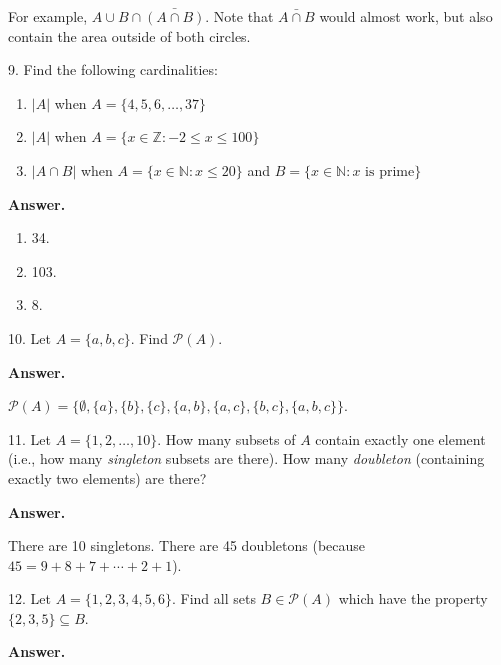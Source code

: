 \documentclass[10pt,]{book}
\theoremstyle{plain}
\theoremstyle{definition}
\theoremstyle{definition}
\theoremstyle{definition}
\def\N{\mathbb N}
\def\Z{\mathbb Z}
\def\pow{\mathcal P}
\def\st{:}
\begin{document}
\begin{exerciselist}
            For example, \(A \cup B \cap \bar{(A \cap B)}\). Note that \(\bar{A \cap B}\) would almost work, but also contain the area outside of both circles.
\item[9.]\hypertarget{exercise-9}{}
            Find the following cardinalities:
\leavevmode%
\begin{enumerate}[label=(\alph*)]
\item\hypertarget{li-108}{}\(|A|\) when \(A = \{4,5,6,\ldots,37\}\)\item\hypertarget{li-109}{}\(|A|\) when \(A = \{x \in \Z \st -2 \le x \le 100\}\)\item\hypertarget{li-110}{}\(|A \cap B|\) when \(A = \{x \in \N \st x \le 20\}\) and \(B = \{x \in \N \st x \mbox{ is prime} \}\)\end{enumerate}
\par\smallskip
\par\smallskip
\noindent\textbf{Answer.}\hypertarget{answer-9}{}\quad
\leavevmode%
\begin{enumerate}[label=(\alph*)]
\item\hypertarget{li-111}{}
                34.
\item\hypertarget{li-112}{}
                103.
\item\hypertarget{li-113}{}
                8.
\end{enumerate}
\item[10.]\hypertarget{exercise-10}{}
            Let \(A = \{a, b, c\}\). Find \(\pow(A)\).
\par\smallskip
\par\smallskip
\noindent\textbf{Answer.}\hypertarget{answer-10}{}\quad

            \(\pow(A) = \{\emptyset, \{a\}, \{b\}, \{c\}, \{a,b\}, \{a,c\}, \{b,c\}, \{a,b,c\}\}\).
\item[11.]\hypertarget{exercise-11}{}
            Let \(A = \{1,2,\ldots, 10\}\). How many subsets of \(A\) contain exactly one element (i.e., how many \emph{singleton} subsets are there). How many \emph{doubleton} (containing exactly two elements) are there?
\par\smallskip
\par\smallskip
\noindent\textbf{Answer.}\hypertarget{answer-11}{}\quad

            There are 10 singletons. There are 45 doubletons (because \(45 = 9+8+7+\cdots+2+1\)).
\item[12.]\hypertarget{exercise-12}{}
            Let \(A = \{1,2,3,4,5,6\}\). Find all sets \(B \in \pow(A)\) which have the property \(\{2,3,5\} \subseteq B\).
\par\smallskip
\par\smallskip
\noindent\textbf{Answer.}\hypertarget{answer-12}{}\quad


\end{exerciselist}
\end{document}
